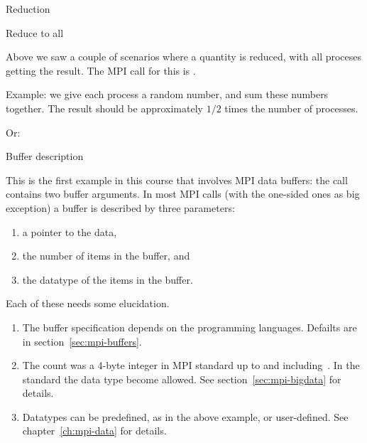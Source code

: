 
 {Reduction}
\label{sec:allreduce}

 {Reduce to all}

Above we saw a couple of scenarios where a quantity is reduced, with
all proceses getting the result. The MPI call for this is
%
.

Example: we give each process a random number, and sum these numbers together.
The result should be approximately $1/2$ times the number of processes.


Or:


 {Buffer description}

This is the first example in this course that involves MPI data buffers:
the  call contains two buffer arguments.
In most MPI calls (with the one-sided ones as big exception)
a buffer is described by three parameters:
\begin{enumerate}
\item a pointer to the data,
\item the number of items in the buffer, and
\item the datatype of the items in the buffer.
\end{enumerate}
Each of these needs some elucidation.
\begin{enumerate}
\item The buffer specification depends on the programming languages.
  Defailts are in section~\ref{sec:mpi-buffers}.
\item The count was a 4-byte integer in MPI standard
  up to and including~.
  In the  standard the  data type
  become allowed. See section~\ref{sec:mpi-bigdata} for details.
\item Datatypes can be predefined, as in the above example, or user-defined.
  See chapter~\ref{ch:mpi-data} for details.
\end{enumerate}

